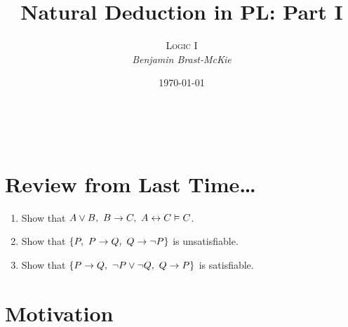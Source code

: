 \documentclass[a4paper, 11pt]{article} %
\title{\textbf{Natural Deduction in PL: Part I}} %
\author{\textsc{Logic I}\\ \em Benjamin Brast-McKie} %
\date{\today} %
\makeatletter
\renewcommand{\maketitle}{
\begin{flushright}
{\LARGE\@title}

\vspace{10pt}

{\@author}
\\ \@date
\end{flushright}

\vspace{-20pt}

}
\makeatother
\begin{document}
\maketitle %

\thispagestyle{empty}


\section*{Review from Last Time\ldots}

\begin{enumerate}
  \item Show that $A \vee B,\ B \rightarrow C,\ A \leftrightarrow C \vDash C$.
  \item Show that $\{P,\ P \rightarrow Q,\ Q \rightarrow \neg P\}$ is unsatisfiable. 
  \item Show that $\lbrace P \rightarrow Q,\ \neg P \vee \neg Q,\ Q \rightarrow P\rbrace$ is satisfiable.
\end{enumerate}





\section*{Motivation}
\end{document}
